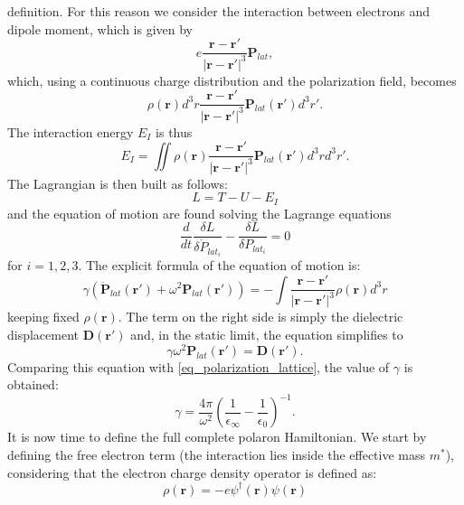 definition. For this reason we consider the interaction between electrons and dipole moment, which is given by 
\begin{equation}
    e\frac{\mathbf{r}-\mathbf{r}'}{|\mathbf{r}-\mathbf{r}'|^3}\mathbf{P}_{lat},
\end{equation}
which, using a continuous charge distribution and the polarization field, becomes
\begin{equation}
    \rho(\mathbf{r})d^3r\frac{\mathbf{r}-\mathbf{r}'}{|\mathbf{r}-\mathbf{r}'|^3}\mathbf{P}_{lat}(\mathbf{r}')d^3r'.
\end{equation}
The interaction energy $E_I$ is thus
\begin{equation}
    E_I=\iint \rho(\mathbf{r})\frac{\mathbf{r}-\mathbf{r}'}{|\mathbf{r}-\mathbf{r}'|^3}\mathbf{P}_{lat}(\mathbf{r}')d^3rd^3r'.
\end{equation}
The Lagrangian is then built as follows:
\begin{equation}
    L=T-U-E_I
\end{equation}
and the equation of motion are found solving the Lagrange equations
\begin{equation}
    \frac{d}{dt}\frac{\delta L}{\delta \dot{P}_{lat_i}}-\frac{\delta L}{\delta P_{lat_i}}=0
\end{equation}
for $i=1,2,3$. The explicit formula of the equation of motion is:
\begin{equation}
    \gamma(\ddot{\mathbf{P}}_{lat}(\mathbf{r}')+\omega^2\mathbf{P}_{lat}(\mathbf{r}'))=-\int \frac{\mathbf{r}-\mathbf{r}'}{|\mathbf{r}-\mathbf{r'}|^3}\rho(\mathbf{r})d^3r
\end{equation}
keeping fixed $\rho(\mathbf{r})$. The term on the right side is simply the dielectric displacement $\mathbf{D}(\mathbf{r}')$ and, in the 
static limit, the equation simplifies to
\begin{equation}
    \gamma\omega^2\mathbf{P}_{lat}(\mathbf{r}')=\mathbf{D}(\mathbf{r}').
\end{equation}
Comparing this equation with \ref{eq_polarization_lattice}, the value of $\gamma$ is obtained:
\begin{equation}
    \gamma = \frac{4\pi}{\omega^2}\left(\frac{1}{\epsilon_\infty}-\frac{1}{\epsilon_0}\right)^{-1}.
\end{equation}
It is now time to define the full complete polaron Hamiltonian. We start by defining the free electron term (the interaction lies inside 
the effective mass $m^*$), considering that the electron charge density operator is defined as:
\begin{equation}
    \rho(\mathbf{r})=-e\psi^\dagger(\mathbf{r})\psi(\mathbf{r})
\end{equation}
